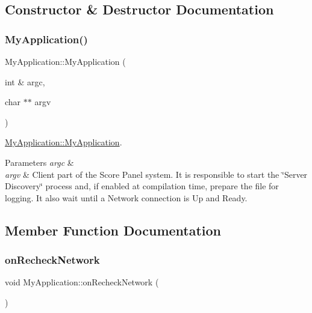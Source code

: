 \subsection{Constructor \& Destructor Documentation}
\mbox{\label{classMyApplication_a4b9e70ce40a83d5d4ae99253a6933c02}} 
\subsubsection{\texorpdfstring{My\+Application()}{MyApplication()}}
{\footnotesize\ttfamily My\+Application\+::\+My\+Application (\begin{DoxyParamCaption}\item[{int \&}]{argc,  }\item[{char $\ast$$\ast$}]{argv }\end{DoxyParamCaption})}



\mbox{\hyperlink{classMyApplication_a4b9e70ce40a83d5d4ae99253a6933c02}{My\+Application\+::\+My\+Application}}. 


\begin{DoxyParams}{Parameters}
{\em argc} & \\
\hline
{\em argv} & Client part of the Score Panel system. It is responsible to start the \char`\"{}\+Server Discovery\char`\"{} process and, if enabled at compilation time, prepare the file for logging. It also wait until a Network connection is Up and Ready. \\
\hline
\end{DoxyParams}


\subsection{Member Function Documentation}
\mbox{\label{classMyApplication_a5c8b62671675099c66b9e4cc887f69a5}} 
\subsubsection{\texorpdfstring{on\+Recheck\+Network}{onRecheckNetwork}}
{\footnotesize\ttfamily void My\+Application\+::on\+Recheck\+Network (\begin{DoxyParamCaption}{ }\end{DoxyParamCaption})\hspace{0.3cm}{\ttfamily [slot]}}



